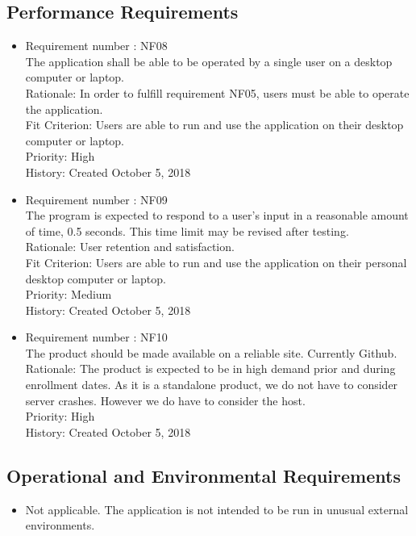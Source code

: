 \documentclass[12pt, titlepage]{article}
\begin{document}
\subsection{Performance Requirements}
\begin{itemize}
\item Requirement number : NF08\\
The application shall be able to be operated by a single user on a desktop computer or laptop.\\
Rationale: In order to fulfill requirement NF05, users must be able to operate the application.\\
Fit Criterion: Users are able to run and use the application on their desktop computer or laptop.\\
Priority: High\\
History: Created October 5, 2018

\item Requirement number : NF09\\
The program is expected to respond to a user's input in a reasonable amount of time, 0.5 seconds. This time limit may be revised after testing.  \\
Rationale: User retention and satisfaction.\\
Fit Criterion: Users are able to run and use the application on their personal desktop computer or laptop.\\
Priority: Medium\\
History: Created October 5, 2018

\item Requirement number : NF10\\
The product should be made available on a reliable site. Currently Github. \\
Rationale: The product is expected to be in high demand prior and during enrollment dates. As it is a standalone product, we do not have to consider server crashes. However we do have to consider the host. \\
Priority: High\\
History: Created October 5, 2018

\end{itemize}
\subsection{Operational and Environmental Requirements}
\begin{itemize}
\item Not applicable.  The application is not intended to be run in unusual external environments.

\end{itemize}
\end{document}
